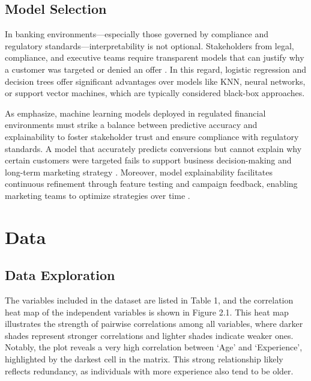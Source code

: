 \documentclass[12pt]{article}
\begin{document}
\subsection{Model Selection}
In banking environments—especially those governed by compliance and regulatory standards—interpretability is not optional. Stakeholders from legal, compliance, and executive teams require transparent models that can justify why a customer was targeted or denied an offer\citep{Rudin2019StopInstead} . In this regard, logistic regression and decision trees offer significant advantages over models like KNN, neural networks, or support vector machines, which are typically considered black-box approaches.

As \cite{Bucker2022TransparencyScoring}  emphasize, machine learning models deployed in regulated financial environments must strike a balance between predictive accuracy and explainability to foster stakeholder trust and ensure compliance with regulatory standards. A model that accurately predicts conversions but cannot explain why certain customers were targeted fails to support business decision-making and long-term marketing strategy \citep{Bucker2022TransparencyScoring} . Moreover, model explainability facilitates continuous refinement through feature testing and campaign feedback, enabling marketing teams to optimize strategies over time \citep{Melsom2022ExplainableBanking} .

\section{Data}
\subsection{Data Exploration}

The variables included in the dataset are listed in Table 1, and the correlation heat map of the independent variables is shown in Figure 2.1. This heat map illustrates the strength of pairwise correlations among all variables, where darker shades represent stronger correlations and lighter shades indicate weaker ones. Notably, the plot reveals a very high correlation between ‘Age’ and ‘Experience’, highlighted by the darkest cell in the matrix. This strong relationship likely reflects redundancy, as individuals with more experience also tend to be older.
\end{document}
